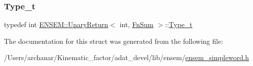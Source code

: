 \subsubsection{\texorpdfstring{Type\_t}{Type\_t}\hspace{0.1cm}{\footnotesize\ttfamily [2/2]}}
{\footnotesize\ttfamily typedef int \mbox{\hyperlink{structENSEM_1_1UnaryReturn}{E\+N\+S\+E\+M\+::\+Unary\+Return}}$<$ int, \mbox{\hyperlink{structENSEM_1_1FnSum}{Fn\+Sum}} $>$\+::\mbox{\hyperlink{structENSEM_1_1UnaryReturn_3_01int_00_01FnSum_01_4_a0a0ed560534b6f9b4671d7bde05b28dc}{Type\+\_\+t}}}



The documentation for this struct was generated from the following file\+:\begin{DoxyCompactItemize}
\item 
/\+Users/archanar/\+Kinematic\+\_\+factor/adat\+\_\+devel/lib/ensem/\mbox{\hyperlink{lib_2ensem_2ensem__simpleword_8h}{ensem\+\_\+simpleword.\+h}}\end{DoxyCompactItemize}
